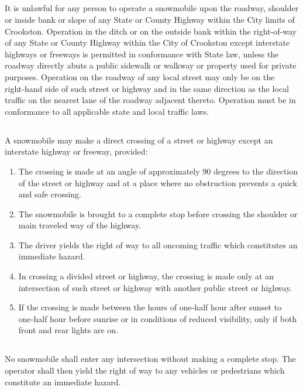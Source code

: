 \subsection{}
It is unlawful for any person to operate a snowmobile upon the roadway, shoulder or inside bank or slope of any State or County Highway within the City limits of Crookston. Operation in the ditch or on the outside bank within the right‑of‑way of any State or County Highway within the City of Crookston except interstate highways or freeways is permitted in conformance with State law, unless the roadway directly abuts a public sidewalk or walkway or property used for private purposes. Operation on the roadway of any local street may only be on the right‑hand side of such street or highway and in the same direction as the local traffic on the nearest lane of the roadway adjacent thereto. Operation must be in conformance to all applicable state and local traffic laws.
\subsection{}
A snowmobile may make a direct crossing of a street or highway except an interstate highway or freeway, provided:
\begin{enumerate}
\item The crossing is made at an angle of approximately 90 degrees to the direction of the street or highway and at a place where no obstruction prevents a quick and safe crossing.
\item The snowmobile is brought to a complete stop before crossing the shoulder or main traveled way of the highway.
\item The driver yields the right of way to all oncoming traffic which constitutes an immediate hazard.
\item In crossing a divided street or highway, the crossing is made only at an intersection of such street or highway with another public street or highway.
\item If the crossing is made between the hours of one‑half hour after sunset to one‑half hour before sunrise or in conditions of reduced visibility, only if both front and rear lights are on.
\end{enumerate}
\subsection{}
No snowmobile shall enter any intersection without making a complete stop. The operator shall then yield the right of way to any vehicles or pedestrians which constitute an immediate hazard.
